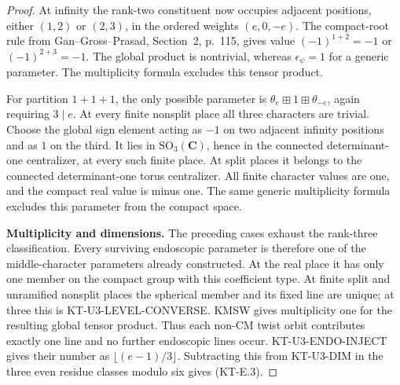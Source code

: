 \documentclass[11pt,a4paper]{article}
\theoremstyle{definition}
\renewcommand{\paragraph}[1]{\par\smallskip\noindent\textbf{#1}\quad\ignorespaces}
\begin{document}
\begin{proof}
At infinity the rank-two constituent now occupies adjacent
positions, either $(1,2)$ or $(2,3)$, in the ordered weights
$(e,0,-e)$. The compact-root rule from Gan--Gross--Prasad,
Section~2, p.~115, gives value $(-1)^{1+2}=-1$ or
$(-1)^{2+3}=-1$. The global product is nontrivial, whereas
$\epsilon_\psi=1$ for a generic parameter. The multiplicity
formula excludes this tensor product.

For partition $1+1+1$, the only possible parameter is
$\theta_e\boxplus1\boxplus\theta_{-e}$, again requiring
$3\mid e$. At every finite nonsplit place all three characters
are trivial. Choose the global sign element acting as $-1$ on
two adjacent infinity positions and as $1$ on the third.
It lies in $\mathrm{SO}_3(\mathbf C)$, hence in the connected
determinant-one centralizer, at every such finite place. At
split places it belongs to the connected determinant-one torus
centralizer. All finite character values are one, and the
compact real value is minus one. The same generic multiplicity
formula excludes this parameter from the compact space.

\paragraph{Multiplicity and dimensions.}
The preceding cases exhaust the rank-three classification.
Every surviving endoscopic parameter is therefore one of the
middle-character parameters already constructed. At the real
place it has only one member on the compact group with this
coefficient type. At finite split and unramified nonsplit places
the spherical member and its fixed line are unique; at three
this is KT-U3-LEVEL-CONVERSE. KMSW gives multiplicity one for
the resulting global tensor product. Thus each non-CM twist
orbit contributes exactly one line and no further endoscopic
lines occur. KT-U3-ENDO-INJECT gives their number as
$\lfloor(e-1)/3\rfloor$. Subtracting this from KT-U3-DIM in
the three even residue classes modulo six gives (KT-E.3).
\end{proof}
\end{document}
